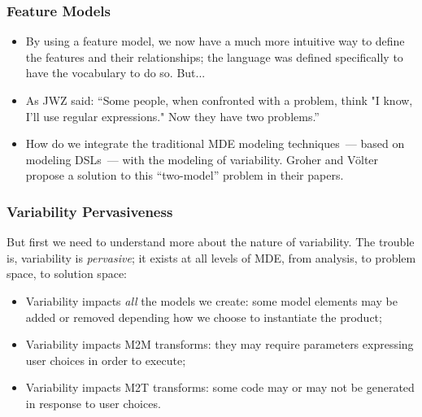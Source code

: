\documentclass{beamer}
\begin{document}
\begin{frame}
\frametitle{Feature Models}

\begin{itemize}

\item By using a feature model, we now have a much more intuitive way
  to define the features and their relationships; the language was
  defined specifically to have the vocabulary to do so. But...

  \pause

\item As JWZ said: ``Some people, when confronted with a problem,
  think "I know, I'll use regular expressions." Now they have two
  problems.''

  \pause

\item How do we integrate the traditional \ac{MDE} modeling
  techniques~--- based on modeling \ac{DSL}s~--- with the modeling of
  variability. Groher and V{\"o}lter propose a solution to this
  ``two-model'' problem in their papers.

\end{itemize}

\end{frame}

\begin{frame}
\frametitle{Variability Pervasiveness}

But first we need to understand more about the nature of
variability. The trouble is, variability is \emph{pervasive}; it
exists at all levels of \ac{MDE}, from analysis, to problem space, to
solution space:

\pause

\begin{itemize}
\item Variability impacts \emph{all} the models we create: some
  model elements may be added or removed depending how we choose to
  instantiate the product;

  \pause

\item Variability impacts \ac{M2M} transforms: they may require
  parameters expressing user choices in order to execute;

  \pause

\item Variability impacts \ac{M2T} transforms: some code may or may
  not be generated in response to user choices.

\end{itemize}

\end{frame}
\end{document}
